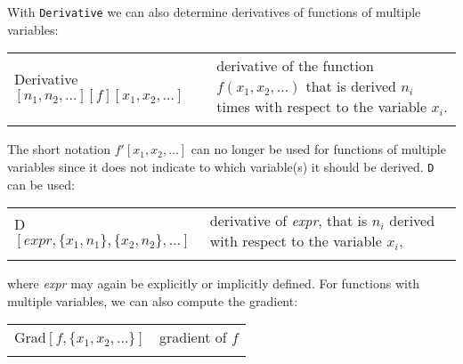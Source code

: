 


With \lstinline{Derivative} we can also determine derivatives of functions of multiple variables:

\begin{tabular}{>{\hfill}p{8cm}p{9cm}}
	Derivative$[n_1,n_2,\ldots ][f][x_1,x_2,\ldots]$			&			derivative of the function $f(x_1,x_2,\ldots)$ that is derived $n_i$ times with respect to the variable $x_i$.\\
	\multicolumn{2}{l}{} 
\end{tabular}

The short notation  $f'[x_1,x_2,\ldots]$ can no longer be used for functions of multiple variables since it does not indicate to which variable(s) it should be derived. \lstinline{D} can be used:

\begin{tabular}{>{\hfill}p{8cm}p{9cm}}
	D$[expr,\{x_1,n_1\},\{x_2,n_2\},\ldots]$				&			derivative of \textit{expr}, that is $n_i$ derived with respect to the variable $x_i$,\\
	\multicolumn{2}{l}{} 
\end{tabular}

where \textit{expr} may again be explicitly or implicitly defined.
For functions with multiple variables, we can also compute the gradient:

\begin{tabular}{>{\hfill}p{8cm}p{9cm}}
	Grad$[f,\{x_1,x_2,\ldots\}]$				&			gradient of $f$\\
	\multicolumn{2}{l}{} 
\end{tabular}


